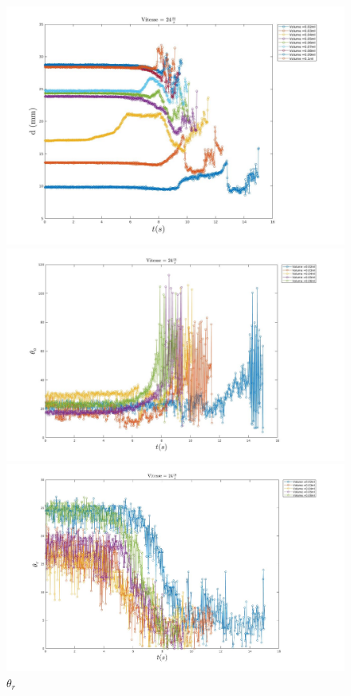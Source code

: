 \documentclass[french]{article}
\begin{document}
\begin{figure}[!h]
	\begin{minipage}{0.95\linewidth}
	\includegraphics[width = \linewidth]{./image/v=24d.jpg}
	\caption{$d$}
	\end{minipage}
	\begin{minipage}{0.95\linewidth}
	\includegraphics[width = \linewidth]{./image/v=24oa_2.jpg}
	\caption{$\theta_{a}$}
	\end{minipage}
	\begin{minipage}{0.95\linewidth}
	\includegraphics[width = \linewidth]{./image/v=24or_2.jpg}
	\caption{$\theta_{r}$}
	\end{minipage}
\end{figure}
\end{document}
